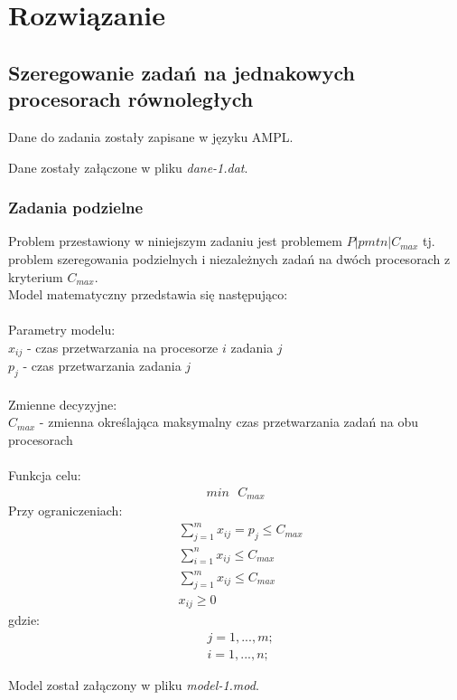 \documentclass[
    12pt, %
]{../fphw}
\begin{document}
\newpage
\section{Rozwiązanie}
\subsection{Szeregowanie zadań na jednakowych procesorach równoległych}
Dane do zadania zostały zapisane w języku AMPL.

Dane zostały załączone w pliku \textit{dane-1.dat}.
\subsubsection{Zadania podzielne}
Problem przestawiony w niniejszym zadaniu jest problemem \(P|pmtn|C_{max}\)
tj. problem szeregowania podzielnych i niezależnych zadań na dwóch procesorach z kryterium \(C_{max}\). \\
Model matematyczny przedstawia się następująco: \\ \\
Parametry modelu: \\
\(x_{ij}\) - czas przetwarzania na procesorze \(i\) zadania \(j\) \\
\(p_j\) - czas przetwarzania zadania \(j\) \\ \\
Zmienne decyzyjne: \\
\(C_{max}\) - zmienna określająca maksymalny czas przetwarzania zadań na obu procesorach \\ \\
Funkcja celu: \\
\begin{align*}
    min \text{ } C_{max}
\end{align*}
Przy ograniczeniach: \\
\begin{align*}
     & \sum^m_{j=1}x_{ij} = p_j \leq C_{max} \\
     & \sum^n_{i=1}x_{ij} \leq C_{max}       \\
     & \sum^m_{j=1}x_{ij} \leq C_{max}       \\
     & x_{ij} \geq 0
\end{align*}
gdzie:
\begin{align*}
     & j = 1, ..., m; \\
     & i = 1, ..., n;
\end{align*}


Model został załączony w pliku \textit{model-1.mod}.
\end{document}
